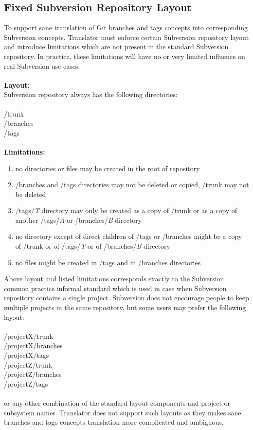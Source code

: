 \subsection{Fixed Subversion Repository Layout}

To support sane translation of Git branches and tags concepts into corresponding Subversion concepts, Translator must enforce certain Subversion repository layout and introduce limitations which are not present in the standard Subversion repository. 
In practice, these limitations will have no or very limited influence on real Subversion use cases.
\\\\
\textbf{Layout:}\\ 
Subversion repository always has the following directories:
\\\\
/trunk\\
/branches\\
/tags\\\\
\textbf{Limitations:}
\begin{enumerate}
\compactlist
\item no directories or files may be created in the root of repository
\item /branches and /tags directories may not be deleted or copied, /trunk may not be deleted
\item /tags/\emph{T} directory may only be created as a copy of /trunk or
as a copy of another /tags/\emph{A} or /branches/\emph{B} directory
\item no directory except of direct children of /tags or /branches might be a
copy of /trunk or of /tags/\emph{T} or of /branches/\emph{B} directory
\item no files might be created in /tags and in /branches directories
\end{enumerate}
Above layout and listed limitations corresponds exactly to the Subversion common practice informal standard which
is used in case when Subversion repository contains a single project. Subversion does not encourage people 
to keep multiple projects in the same repository, but some users may prefer the following layout:
\\\\
/projectX/trunk\\
/projectX/branches\\
/projectX/tags\\
/projectZ/trunk\\
/projectZ/branches\\
/projectZ/tags\\\\
or any other combination of the standard layout components and project or subsystem names. Translator does not support such layouts as they 
makes sane branches and tags concepts translation more complicated and ambiguous.
